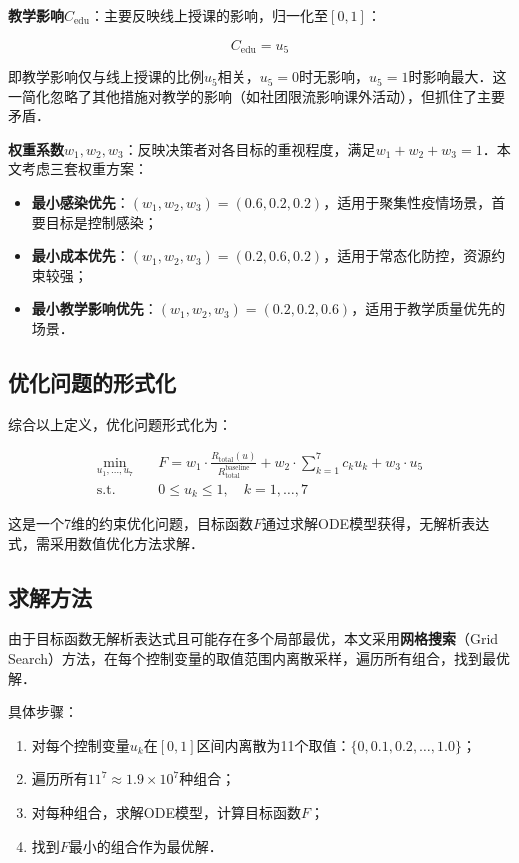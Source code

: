 \textbf{教学影响}$C_{\text{edu}}$：主要反映线上授课的影响，归一化至$[0, 1]$：

\begin{equation}
  C_{\text{edu}} = u_5
\end{equation}

即教学影响仅与线上授课的比例$u_5$相关，$u_5 = 0$时无影响，$u_5 = 1$时影响最大．这一简化忽略了其他措施对教学的影响（如社团限流影响课外活动），但抓住了主要矛盾．

\textbf{权重系数}$w_1, w_2, w_3$：反映决策者对各目标的重视程度，满足$w_1 + w_2 + w_3 = 1$．本文考虑三套权重方案：

\begin{itemize}
  \item \textbf{最小感染优先}：$(w_1, w_2, w_3) = (0.6, 0.2, 0.2)$，适用于聚集性疫情场景，首要目标是控制感染；
  \item \textbf{最小成本优先}：$(w_1, w_2, w_3) = (0.2, 0.6, 0.2)$，适用于常态化防控，资源约束较强；
  \item \textbf{最小教学影响优先}：$(w_1, w_2, w_3) = (0.2, 0.2, 0.6)$，适用于教学质量优先的场景．
\end{itemize}

\subsection{优化问题的形式化}

综合以上定义，优化问题形式化为：

\begin{align}
  \min_{u_1, \ldots, u_7} \quad & F = w_1 \cdot \frac{R_{\text{total}}(u)}{R_{\text{total}}^{\text{baseline}}} + w_2 \cdot \sum_{k=1}^{7} c_k u_k + w_3 \cdot u_5 \\
  \text{s.t.} \quad & 0 \leq u_k \leq 1, \quad k = 1, \ldots, 7
\end{align}

这是一个7维的约束优化问题，目标函数$F$通过求解ODE模型获得，无解析表达式，需采用数值优化方法求解．

\subsection{求解方法}

由于目标函数无解析表达式且可能存在多个局部最优，本文采用\textbf{网格搜索}（Grid Search）方法，在每个控制变量的取值范围内离散采样，遍历所有组合，找到最优解．

具体步骤：

\begin{enumerate}
  \item 对每个控制变量$u_k$在$[0, 1]$区间内离散为11个取值：$\{0, 0.1, 0.2, \ldots, 1.0\}$；
  \item 遍历所有$11^7 \approx 1.9 \times 10^7$种组合；
  \item 对每种组合，求解ODE模型，计算目标函数$F$；
  \item 找到$F$最小的组合作为最优解．
\end{enumerate}

